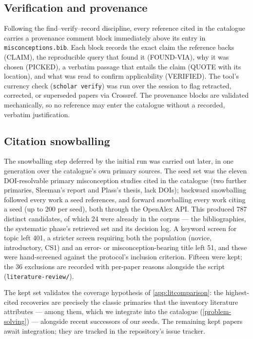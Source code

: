 \subsection{Verification and provenance}

Following the find--verify--record discipline, every reference cited in the
catalogue carries a
provenance comment block immediately above its entry in \texttt{misconceptions.bib}.
Each block records the exact claim the reference backs (\textsf{CLAIM}), the
reproducible query that found it (\textsf{FOUND-VIA}), why it was chosen
(\textsf{PICKED}), a verbatim passage that entails the claim (\textsf{QUOTE} with
its location), and what was read to confirm applicability (\textsf{VERIFIED}).
The tool's currency check (\texttt{scholar verify}) was run over the session to
flag retracted, corrected, or superseded papers via Crossref. The provenance
blocks are validated mechanically, so no reference may enter the catalogue
without a recorded, verbatim justification.

\subsection{Citation snowballing}
\label{app:litsnowball}

The snowballing step deferred by the initial run was carried out later, in one
generation over the catalogue's own primary sources. The seed set was the
eleven DOI-resolvable primary misconception studies cited in the catalogue
(two further primaries, Sleeman's report and Plass's thesis, lack DOIs);
backward snowballing followed every work a seed references, and forward
snowballing every work citing a seed (up to 200 per seed), both through the
OpenAlex API. This produced 787 distinct candidates, of which 24 were already
in the corpus --- the bibliographies, the systematic phase's retrieved set and
its decision log. A keyword screen for topic left 401, a stricter screen
requiring both the population (novice, introductory, CS1) and an error- or
misconception-bearing title left 51, and these were hand-screened against the
protocol's inclusion criterion. Fifteen were kept; the 36 exclusions are
recorded with per-paper reasons alongside the script
(\texttt{literature-review/}).

The kept set validates the coverage hypothesis of \cref{app:litcomparison}:
the highest-cited recoveries are precisely the classic primaries that the
inventory literature attributes --- \textcite{Pea1986Superbug} among them,
which we integrate into the catalogue (\cref{problem-solving}) --- alongside
recent successors of our seeds. The remaining kept papers await integration;
they are tracked in the repository's issue tracker.

